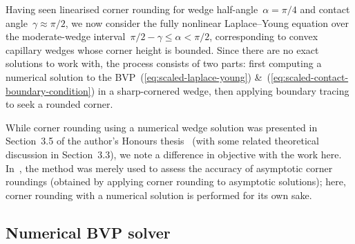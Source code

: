 Having seen linearised corner rounding
for wedge half-angle~$\alpha = \pi/4$
and contact angle~$\gamma \approx \pi/2$,
we now consider the fully nonlinear Laplace--Young equation
over the moderate-wedge interval~$\pi/2 - \gamma \le \alpha < \pi/2$,
corresponding to convex capillary wedges whose corner height is bounded.
Since there are no exact solutions to work with,
the process consists of two parts:
first computing a numerical solution
to the BVP~(\ref{eq:scaled-laplace-young})
\&~(\ref{eq:scaled-contact-boundary-condition})
in a sharp-cornered wedge,
then applying boundary tracing to seek a rounded corner.

While corner rounding using a numerical wedge solution
was presented in Section~3.5
of the author's Honours thesis~\cite{li-2017-thesis-rounding-capillary-wedge}
(with some related theoretical discussion in Section~3.3),
we note a difference in objective with the work here.
In~\cite{li-2017-thesis-rounding-capillary-wedge},
the method was merely used
to assess the accuracy of asymptotic corner roundings
(obtained by applying corner rounding to asymptotic solutions);
here, corner rounding with a numerical solution
is performed for its own sake.

\subsection{Numerical BVP solver}
\label{sec:moderate.nonlinear.numerical}


